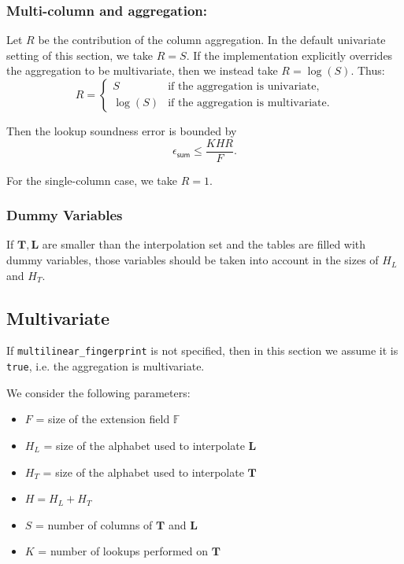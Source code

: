 \subsubsection{Multi-column and aggregation:}

Let $R$ be the contribution of the column aggregation. In the default univariate setting of this section, we take $R=S$. If the implementation explicitly overrides the aggregation to be multivariate, then we instead take $R=\log(S)$. Thus:
\[
R =
\begin{cases}
S & \text{if the aggregation is univariate,}\\
\log(S) & \text{if the aggregation is multivariate.}
\end{cases}
\]

Then the lookup soundness error is bounded by
\[
\epsilon_{\mathsf{sum}}\leq \frac{K H R}{F}.
\]

For the single-column case, we take $R=1$.

\subsubsection{Dummy Variables}

If $\mathbf T, \mathbf L$ are smaller than the interpolation set and the tables are filled with dummy variables, those variables should be taken into account in the sizes of $H_L$ and $H_T$. 

\subsection{Multivariate}

If \texttt{multilinear\_fingerprint} is not specified, then in this section we assume it is \texttt{true}, i.e. the aggregation is multivariate.

We consider the following parameters:
\begin{itemize}
	\item $F$ = size of the extension field $\mathbb{F}$
	\item $H_L$ = size of the alphabet used to interpolate $\mathbf{L}$
	\item $H_T$ = size of the alphabet used to interpolate $\mathbf{T}$
	\item $H = H_L + H_T$
	\item $S$ = number of columns of $\mathbf{T}$ and $\mathbf{L}$
	\item $K$ = number of lookups performed on $\mathbf{T}$
\end{itemize}

